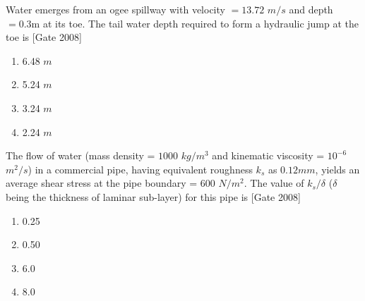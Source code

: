 \iffalse
	\author{ai24btech11019}
	\section{ce}
	\chapter{2008}
\fi
	\item Water emerges from an ogee spillway with velocity $= 13.72$ $m/s$ and depth $= 0.3$m at its toe. The tail water depth required to form a hydraulic jump at the toe is  \hfill [Gate 2008]
\begin{multicols}{4}
	\begin{enumerate}
		\item 6.48 $m$
		\item 5.24 $m$
		\item 3.24 $m$
		\item 2.24 $m$
	\end{enumerate}
\end{multicols}
	\item The flow of water (mass density = $1000$ $kg/m^3$ and kinematic viscosity = $10^{-6}$ $m^2/s$) in a commercial pipe, having equivalent roughness $k_s$ as $0.12mm$, yields an average shear stress at the pipe boundary = $600$ $N/m^2$. The value of $k_s / \delta$ ($\delta$ being the thickness of laminar sub-layer) for this pipe is  \hfill [Gate 2008]
		\begin{multicols}{4}
	\begin{enumerate}
		\item 0.25
		\item 0.50
		\item 6.0
		\item 8.0
	\end{enumerate}
\end{multicols}

